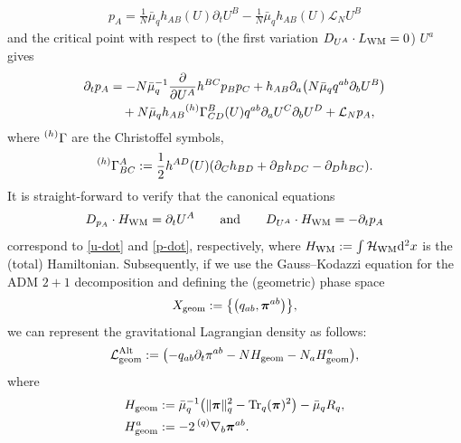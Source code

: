 \documentclass[11pt]{article}
\numberwithin{equation}{section}
\def\ptl{\partial}%
\def\mbo#1{\boldsymbol{#1}}%
\def\grad{{\nabla}}%
\newcommand{\leftexp}[2]{{\vphantom{#2}}^{#1}{#2}}
\def\halb{\frac{1}{2}}%
\numberwithin{equation}{section}
\begin{document}
\begin{align} \label{u-dot}
p_A = \frac{1}{N} \bar{\mu}_q h_{AB} (U) \ptl_t U^B - \frac{1}{N} \bar{\mu}_q h_{AB} (U) \mathcal{L}_N U^B
\end{align}
and the critical point with respect to \big(the first variation $ D_{U^A} \cdot L_{{\rm WM}}=0$\big) $U^a$ gives
\begin{align}
\ptl_t p_A&{}= -N \bar{\mu}^{-1}_q \frac{\ptl}{\ptl U^A}h^{BC} p_B p_C + h_{AB} \ptl_a\bigl(N \bar{\mu}_q q^{ab} \ptl_b U^B\bigr) \notag\\
&\quad{}+ N\bar{\mu}_q h_{AB} \leftexp{(h)}{\Gamma}^B_{CD}(U)q^{ab}\ptl_a U^C \ptl_b U^D
 + \mathcal{L}_N p_A,\label{p-dot}
\end{align}
where $\leftexp{(h)}{\Gamma}$ are the Christoffel symbols,
\[
\leftexp{(h)}{\Gamma}^A_{BC} := \halb h^{AD}(U) (\ptl_C h_{BD} + \ptl_B h_{DC} - \ptl_D h_{BC}).
\]
It is straight-forward to verify that the canonical equations
\begin{align*}
D_{p_A}\cdot H_{{\rm WM}} = \ptl_t U^A \qquad \text{and} \qquad D_{U^A}\cdot H_{{\rm WM}} = - \ptl_t p_A
\end{align*}
correspond to \eqref{u-dot} and \eqref{p-dot}, respectively,
where $H_{{\rm WM}} := \int \mathcal{H}_{{\rm WM}} {\rm d}^2x $ is the (total) Hamiltonian. Subsequently, if we use the Gauss--Kodazzi equation for the ADM $2+1$ decomposition and defining the (geometric) phase space
\begin{align*}
X_{{\rm geom}} := \bigl\{ \bigl(q_{ab}, \mbo{\pi}^{ab}\bigr) \bigr\},
\end{align*}
 we can represent the gravitational Lagrangian density as follows:
\begin{align*}
\mathcal{L}^{{\rm Alt}}_{{\rm geom}} := \bigl(- q_{ab}\ptl_t \pi^{ab} - N H_{{\rm geom}} - N_a H_{{\rm geom}}^a\bigr),
\end{align*}
where
\begin{align*}
&H_{{\rm geom}}:= \bar{\mu}^{-1}_q \bigl(\Vert \mbo{\pi} \Vert_q^2 - {\rm Tr}_q(\mbo{\pi})^2 \bigr) - \bar{\mu}_q R_q, \\
&H_{{\rm geom}}^a := -2\, \leftexp{(q)}{\grad}_b \mbo{\pi}^{ab}.
\end{align*}
\end{document}
